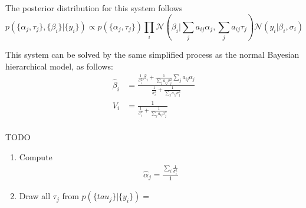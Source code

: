 \documentclass[12pt, oneside]{amsart}
\begin{document}
The posterior distribution for this system follows
\[
p(\{\alpha_j, \tau_j\}, \{\beta_i\} | \{y_i\}) \propto
p(\{\alpha_j, \tau_j\}) \prod_i \mathcal{N}\left(\beta_i | \sum_j
  a_{ij} \alpha_j, \sum_j a_{ij} \tau_j\right)
\mathcal{N}\left(y_i | \beta_i, \sigma_i\right)
\]

This system can be solved by the same simplified process as the normal
Bayesian hierarchical model, as follows:
\begin{align*}
  \hat\beta_i &= \frac{\frac{1}{\sigma_i^2} \beta_i + \frac{1}{\sum_j
                a_{ij} \sigma_j^2} \sum_j a_{ij} \alpha_j}
                {\frac{1}{\sigma_i^2} + \frac{1}{\sum_j a_{ij}
                \sigma_j^2}} \\
  V_i &= \frac{1}{\frac{1}{\sigma_i^2} + \frac{1}{\sum_j a_{ij}
        \sigma_j^2}} \\
\end{align*}

TODO

\begin{enumerate}
\item Compute
\begin{align*}
\hat\alpha_j = \frac{\sum_i \frac{1}{\sigma_i^2}}{1}
\end{align*}
\item Draw all $\tau_j$ from $p(\{tau_j\} | \{y_i\}) =$
\end{enumerate}
\end{document}
